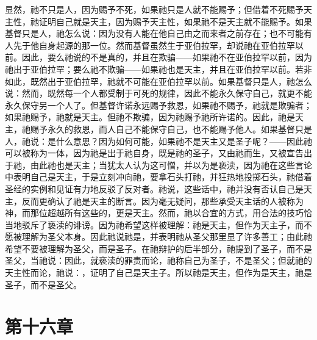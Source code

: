 显然，祂不只是人，因为赐予不死，如果祂只是人就不能赐予；但借着不死赐予天主性，祂证明自己就是天主，因为赐予天主性，如果祂不是天主就不能赐予。如果基督只是人，祂怎么说：因为没有人能在他自己由之而来者之前存在；也不可能有人先于他自身起源的那一位。然而基督虽然生于亚伯拉罕，却说祂在亚伯拉罕以前。因此，要么祂说的不是真的，并且在欺骗——如果祂不在亚伯拉罕以前，因为祂出于亚伯拉罕；要么祂不欺骗——如果祂也是天主，并且在亚伯拉罕以前。若非如此，既然出于亚伯拉罕，祂就不可能在亚伯拉罕以前。如果基督只是人，祂怎么说：然而，既然每一个人都受制于可死的规律，因此不能永久保守自己，就更不能永久保守另一个人了。但基督许诺永远赐予救恩，如果祂不赐予，祂就是欺骗者；如果祂赐予，祂就是天主。但祂不欺骗，因为祂赐予祂所许诺的。因此，祂是天主，祂赐予永久的救恩，而人自己不能保守自己，也不能赐予他人。如果基督只是人，祂说：是什么意思？因为如何可能，如果祂不是天主又是圣子呢？——因此祂可以被称为一体，因为祂是出于祂自身，既是祂的圣子，又由祂而生，又被宣告出于祂，由此祂也是天主；当犹太人认为这可憎，并以为是亵渎，因为祂在这些言论中表明自己是天主，于是立刻冲向祂，要拿石头打祂，并狂热地投掷石头，祂借着圣经的实例和见证有力地反驳了反对者。祂说，这些话中，祂并没有否认自己是天主，反而更确认了祂是天主的断言。因为毫无疑问，那些承受天主话的人被称为神，而那位超越所有这些的，更是天主。然而，祂以合宜的方式，用合法的技巧恰当地驳斥了亵渎的诽谤。因为祂希望这样被理解：祂是天主，但作为天主子，而不愿被理解为圣父本身。因此祂说祂是，并表明祂从圣父那里显了许多善工；由此祂希望不要被理解为圣父，而是圣子。在祂辩护的后半部分，祂提到了圣子，而不是圣父，当祂说：因此，就亵渎的罪责而论，祂称自己为圣子，不是圣父；但就祂的天主性而论，祂说：，证明了自己是天主子。所以祂是天主，但作为是天主，祂是圣子，而不是圣父。\par


\section{第十六章}

\par

